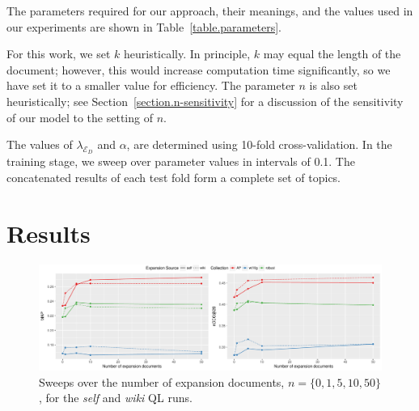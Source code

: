 \documentclass[sigconf]{acmart}
\begin{document}
The parameters required for our approach, their meanings, and the values used in our experiments are shown in Table~\ref{table.parameters}. 

For this work, we set $k$ heuristically. In principle, $k$ may equal the length of the document; however, this would increase computation time significantly, so we have set it to a smaller value for efficiency. The parameter $n$ is also set heuristically; see Section~\ref{section.n-sensitivity} for a discussion of the sensitivity of our model to the setting of $n$.

The values of $\lambda_{\mathcal{E}_D}$ and $\alpha$, are determined using 10-fold cross-validation. In the training stage, we sweep over parameter values in intervals of 0.1. The concatenated results of each test fold form a complete set of topics.

\section{Results}\label{section.results}

\begin{figure}
\centering
\includegraphics[width=\linewidth]{figures/expansion-sweep.pdf}
\caption{Sweeps over the number of expansion documents, $n = \{0, 1, 5, 10, 50\}$, for the \textit{self} and \textit{wiki} QL runs.}
\label{figure.n-sweeps}
\end{figure}
\end{document}
